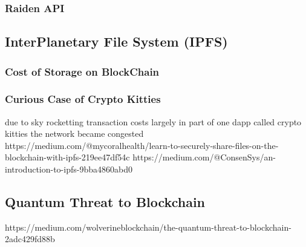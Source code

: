 \subsubsection{Raiden API}

\subsection{InterPlanetary File System (IPFS)}
\subsubsection{Cost of Storage on BlockChain}
\subsubsection{Curious Case of Crypto Kitties}
due to sky rocketting transaction costs largely in part of one dapp called crypto kitties the network became congested
https://medium.com/@mycoralhealth/learn-to-securely-share-files-on-the-blockchain-with-ipfs-219ee47df54c
https://medium.com/@ConsenSys/an-introduction-to-ipfs-9bba4860abd0
\subsection{Quantum Threat to Blockchain}
https://medium.com/wolverineblockchain/the-quantum-threat-to-blockchain-2adc429fd88b
